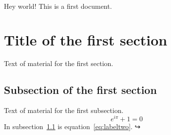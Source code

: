\documentclass{article}
\begin{document}
 Hey world!
 This is a first document.
 \section{Title of the first section}
 Text of material for the first section.
 \subsection{Subsection of the first section}
 \label{subsec:labelone}
 Text of material for the first subsection.
 \begin{equation}
 e^{i\pi}+1 = 0
 \label{eq:labeltwo}
 \end{equation}
 In subsection~\ref{subsec:labelone} is
 equation~\ref{eq:labeltwo}.
 ↪
 
\end{document}
